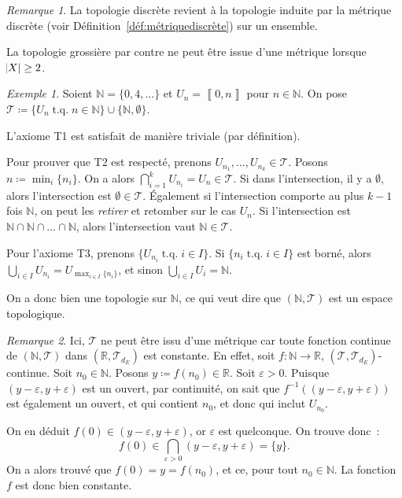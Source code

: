 \documentclass{report}
\theoremstyle{definition}
\theoremstyle{remark}
\newtheorem*{rmq}{Remarque}
\newtheorem{ex}{Exemple}[section]
\DeclareMathOperator{\tq}{\text{ t.q. }}
\newcommand{\intint}[2]{\left\llbracket#1, #2\right\rrbracket}
\newcommand{\R}{\mathbb R}
\newcommand{\N}{\mathbb N}
\renewcommand{\top}{\mathcal T}
\begin{document}
		\begin{rmq} La topologie discrète revient à la topologie induite par la métrique discrète (voir Définition~\ref{déf:métriquediscrète}) sur un ensemble.

		La topologie grossière par contre ne peut être issue d'une métrique lorsque $\abs X \geq 2$.
		\end{rmq}

		\begin{ex} Soient $\N = \{0, 4, \ldots\}$ et $U_n = \intint 0n$ pour $n \in \N$. On pose $\top \coloneqq \{U_n \tq n \in \N\} \cup \{\N, \emptyset\}$.

		L'axiome T1 est satisfait de manière triviale (par définition).

		Pour prouver que T2 est respecté, prenons $U_{n_1}, \ldots, U_{n_k} \in \top$. Posons $n \coloneqq \min_i\{n_i\}$. On a alors
		$\bigcap_{i=1}^kU_{n_i} = U_n \in \top$. Si dans l'intersection, il y a $\emptyset$, alors l'intersection est $\emptyset \in \top$. Également si
		l'intersection comporte au plus $k-1$ fois $\N$, on peut les \textit{retirer} et retomber sur le cas $U_n$. Si l'intersection est
		$\N \cap \N \cap \ldots \cap \N$, alors l'intersection vaut $\N \in \top$.

		Pour l'axiome T3, prenons $\{U_{n_i} \tq i \in I\}$. Si $\{n_i \tq i \in I\}$ est borné, alors $\bigcup_{i \in I}U_{n_i} = U_{\max_{i \in I}\{n_i\}}$,
		et sinon $\bigcup_{i \in I}U_i = \N$.

		On a donc bien une topologie sur $\N$, ce qui veut dire que $(\N, \top)$ est un espace topologique.
		\end{ex}

		\begin{rmq} Ici, $\top$ ne peut être issu d'une métrique car toute fonction continue de $(\N, \top)$ dans $(\R, \top_{d_E})$ est constante. En effet,
		soit $f : \N \to \R$, $(\top, \top_{d_E})$-continue. Soit $n_0 \in \N$. Posons $y \coloneqq f(n_0) \in \R$. Soit $\varepsilon > 0$. Puisque
		$(y-\varepsilon, y+\varepsilon)$ est un ouvert, par continuité, on sait que $f^{-1}\left((y-\varepsilon, y+\varepsilon)\right)$ est également un ouvert,
		et qui contient $n_0$, et donc qui inclut $U_{n_0}$.

		On en déduit $f(0) \in (y-\varepsilon, y+\varepsilon)$, or $\varepsilon$ est quelconque. On trouve donc~:
		\[f(0) \in \bigcap_{\varepsilon > 0}(y-\varepsilon, y+\varepsilon) = \{y\}.\]
		On a alors trouvé que $f(0) = y = f(n_0)$, et ce, pour tout $n_0 \in \N$. La fonction $f$ est donc bien constante.
		\end{rmq}
\end{document}
